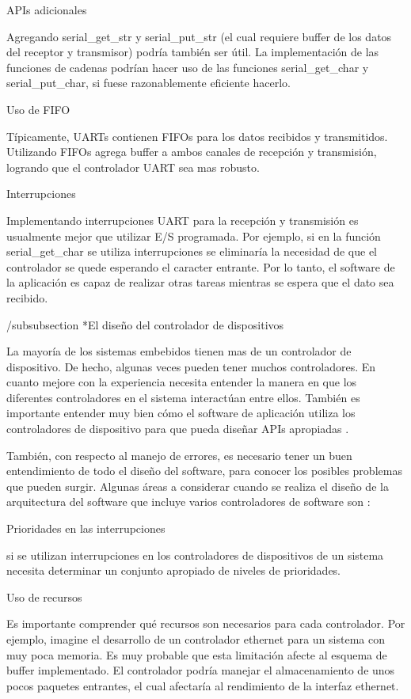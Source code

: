 \documentclass[12pt]{article}
\begin{document}
APIs adicionales

Agregando serial\_get\_str y serial\_put\_str (el cual requiere buffer de
los datos del receptor y transmisor) podría también ser útil. La implementación
de las funciones de cadenas podrían hacer uso de las funciones
serial\_get\_char y serial\_put\_char, si fuese razonablemente eficiente
hacerlo.

Uso de FIFO

Típicamente, UARTs contienen FIFOs para los datos recibidos y transmitidos.
Utilizando FIFOs agrega buffer a ambos canales de recepción y transmisión,
logrando que el controlador UART  sea mas robusto.

Interrupciones

Implementando interrupciones UART para la recepción y transmisión es
usualmente mejor que utilizar E/S programada. Por ejemplo, si en la función
serial\_get\_char se utiliza interrupciones se eliminaría la necesidad
de que el controlador se quede esperando el caracter entrante. 
Por lo tanto, el software de la aplicación es capaz de realizar
otras tareas mientras se espera que el dato sea recibido. 

/subsubsection *{El diseño del controlador de dispositivos}

La mayoría de los sistemas embebidos tienen mas de un controlador de dispositivo.
De hecho, algunas veces pueden tener muchos controladores. En cuanto
mejore con la experiencia necesita entender la manera en que los
diferentes controladores en el sistema interactúan entre ellos. 
También es importante entender muy bien cómo el software de aplicación 
utiliza los controladores de dispositivo para que pueda diseñar APIs apropiadas
.

También, con respecto al manejo de errores, es necesario tener un buen entendimiento de todo el diseño
del software, para conocer los posibles problemas que pueden surgir.
Algunas áreas a considerar cuando se realiza el diseño de la arquitectura
del software que incluye varios controladores de software son :

Prioridades en las interrupciones

si se utilizan interrupciones en los controladores de dispositivos
de un sistema necesita determinar un conjunto apropiado de niveles
de prioridades.


Uso de recursos

Es importante comprender qué recursos son necesarios para cada controlador.
Por ejemplo, imagine el desarrollo de un controlador ethernet para un 
sistema con muy poca memoria.
Es muy probable que esta limitación afecte al esquema de buffer implementado.
El controlador podría manejar el almacenamiento de unos
pocos paquetes entrantes, el cual afectaría al rendimiento de la 
interfaz ethernet.
\end{document}
